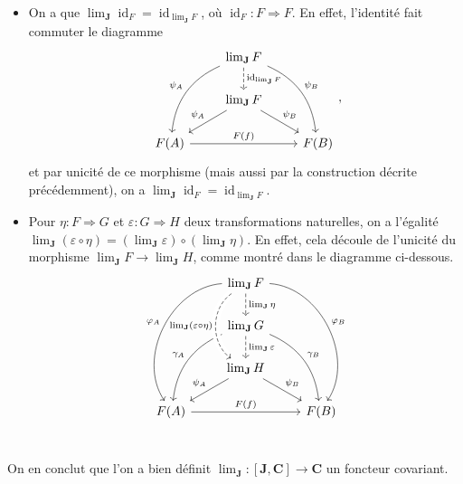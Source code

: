 \documentclass{../../td}
\newcommand\id{\ensuremath{\operatorname{id}}}
\begin{document}
  \begin{itemize}
    \item On a que $\lim_\mathbf{J} \id_F = \id_{\lim_\mathbf{J} F}$, où $\id_F : F \Rightarrow F$.
      En effet, l'identité fait commuter le diagramme
      \[
      \begin{tikzcd}
          & \lim_\mathbf{J} F \arrow[dashed]{d}{\id_{\lim_\mathbf{J} F}} \arrow[bend right,swap]{ddl}{\psi_A} \arrow[bend left]{ddr}{\psi_B}\\
          & \lim_\mathbf{J} F \arrow[swap]{dl}{\psi_A} \arrow{dr}{\psi_B}\\
          F(A) \arrow{rr}{F(f)} & & F(B)
      \end{tikzcd}
      ,\] 
      et par unicité de ce morphisme (mais aussi par la construction décrite précédemment), on a $\lim_\mathbf{J} \id_F = \id_{\lim_\mathbf{J} F}$.
    \item Pour $\eta : F \Rightarrow G$ et $\varepsilon : G \Rightarrow H$ deux transformations naturelles, on a l'égalité $\lim_\mathbf{J} (\varepsilon \circ \eta) = (\lim_\mathbf{J} \varepsilon)\circ(\lim_\mathbf{J} \eta)$.
      En effet, cela découle de l'unicité du morphisme $\lim_\mathbf{J} F \to \lim_\mathbf{J} H$, comme montré dans le diagramme ci-dessous.
      \[
      \begin{tikzcd}
          & \lim_\mathbf{J} F \arrow[dashed]{d}{\lim_\mathbf{J} \eta} \arrow[bend right=60,swap]{dddl}{\varphi_A} \arrow[bend left=60]{dddr}{\varphi_B} \\
          & \lim_\mathbf{J} G \arrow[dashed]{d}{\lim_\mathbf{J} \varepsilon} \arrow[bend right,swap]{ddl}{\gamma_A} \arrow[bend left]{ddr}{\gamma_B}\\
          & \lim_\mathbf{J} H \arrow[swap]{dl}{\psi_A} \arrow{dr}{\psi_B}\\
          F(A) \arrow{rr}{F(f)} & & F(B)
          \arrow[from=1-2,to=3-2,dashed,bend right=55,crossing over, swap]{dd}{\lim_\mathbf{J}(\varepsilon\circ\eta)}\\
      \end{tikzcd}
      \] 
  \end{itemize}

  On en conclut que l'on a bien définit $\lim_\mathbf{J} : [\mathbf{J}, \mathbf{C}] \to \mathbf{C}$ un foncteur covariant.
\end{document}
